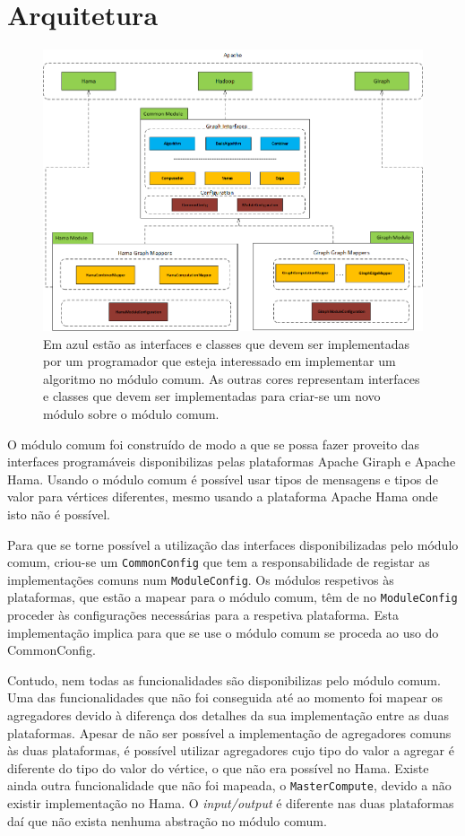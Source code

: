 \chapter{Arquitetura}
\begin{figure}[H]
	\centering
		\includegraphics[width=\linewidth]{arquitetura}
	\caption{Em azul estão as interfaces e classes que devem ser implementadas por um programador que esteja interessado em implementar um algoritmo no módulo comum. As outras cores representam interfaces e classes que devem ser implementadas para criar-se um novo módulo sobre o módulo comum.}
	\label{fig:arquitetura}
\end{figure}

O módulo comum foi construído de modo a que se possa fazer proveito das interfaces programáveis disponibilizas pelas plataformas Apache Giraph e Apache Hama. Usando o módulo comum é possível usar tipos de mensagens e tipos de valor para vértices diferentes, mesmo usando a plataforma Apache Hama onde isto não é possível.

Para que se torne possível a utilização das interfaces disponibilizadas pelo módulo comum, criou-se um \texttt{CommonConfig} que tem a responsabilidade de registar as implementações comuns num \texttt{ModuleConfig}. Os módulos respetivos às plataformas, que estão a mapear para o módulo comum, têm de no \texttt{ModuleConfig} proceder às configurações necessárias para a respetiva plataforma. Esta implementação implica para que se use o módulo comum se proceda ao uso do CommonConfig.

Contudo, nem todas as funcionalidades são disponibilizas pelo módulo comum. Uma das funcionalidades que não foi conseguida até ao momento foi mapear os agregadores devido à diferença dos detalhes da sua implementação entre as duas plataformas. Apesar de não ser possível a implementação de agregadores comuns às duas plataformas, é possível utilizar agregadores cujo tipo do valor a agregar é diferente do tipo do valor do vértice, o que não era possível no Hama. Existe ainda outra funcionalidade que não foi mapeada, o \texttt{MasterCompute}, devido a não existir implementação no Hama. O \textit{input/output} é diferente nas duas plataformas daí que não exista nenhuma abstração no módulo comum.